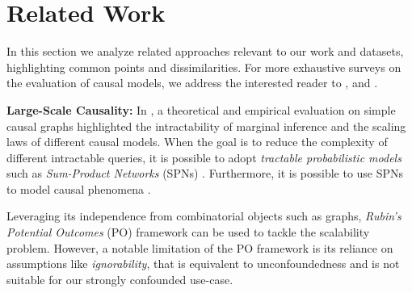 \section{Related Work}
In this section we analyze related approaches relevant to our work and datasets, highlighting common points and dissimilarities. For more exhaustive surveys on the evaluation of causal models, we address the interested reader to \cite{Cheng2022EvaluationMA}, \cite{DBLP:journals/csur/GuoCLH020} and \cite{DBLP:journals/tkdd/YaoCLLGZ21}.

\textbf{Large-Scale Causality:} In \cite{notallcausalinferencezece}, a theoretical and empirical evaluation on simple causal graphs highlighted the intractability of marginal inference and the scaling laws of different causal models. When the goal is to reduce the complexity of different intractable queries, it is possible to adopt \textit{tractable probabilistic models} such as \textit{Sum-Product Networks} (SPNs) \citep{poon2012sumproductnetworksnewdeep}. Furthermore, it is possible to use SPNs to model causal phenomena \citep{zecevic2021interventional, structuralcausalcircuits, poonia2024chispn, pmlr-v246-busch24a}.

Leveraging its independence from combinatorial objects such as graphs, \textit{Rubin's Potential Outcomes} (PO) framework \citep{Imbens_Rubin_2015} can be used to tackle the scalability problem. However, a notable limitation of the PO framework is its reliance on assumptions like \textit{ignorability}, that is equivalent to unconfoundedness and is not suitable for our strongly confounded use-case.


